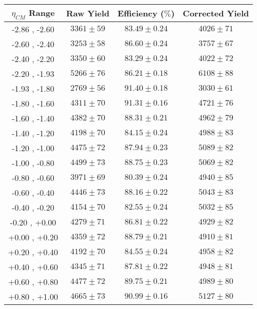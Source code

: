 \begin{table}[!h]
  \centering
  \renewcommand{\arraystretch}{1.5}
  \begin{tabular}{|c|*3c|}
    \hline
    $\eta_{CM}$ Range & Raw Yield & Efficiency ($\%$) & Corrected Yield\\
    \hline\hline
    -2.86 , -2.60 & $3361 \pm 59$ & $83.49 \pm 0.24$ & $4026 \pm 71$\\
    \hline
    -2.60 , -2.40 & $3253 \pm 58$ & $86.60 \pm 0.24$ & $3757 \pm 67$\\
    \hline
    -2.40 , -2.20 & $3350 \pm 60$ & $83.29 \pm 0.24$ & $4022 \pm 72$\\
    \hline
    -2.20 , -1.93 & $5266 \pm 76$ & $86.21 \pm 0.18$ & $6108 \pm 88$\\
    \hline
    -1.93 , -1.80 & $2769 \pm 56$ & $91.40 \pm 0.18$ & $3030 \pm 61$\\
    \hline
    -1.80 , -1.60 & $4311 \pm 70$ & $91.31 \pm 0.16$ & $4721 \pm 76$\\
    \hline
    -1.60 , -1.40 & $4382 \pm 70$ & $88.31 \pm 0.21$ & $4962 \pm 79$\\
    \hline
    -1.40 , -1.20 & $4198 \pm 70$ & $84.15 \pm 0.24$ & $4988 \pm 83$\\
    \hline
    -1.20 , -1.00 & $4475 \pm 72$ & $87.94 \pm 0.23$ & $5089 \pm 82$\\
    \hline
    -1.00 , -0.80 & $4499 \pm 73$ & $88.75 \pm 0.23$ & $5069 \pm 82$\\
    \hline
    -0.80 , -0.60 & $3971 \pm 69$ & $80.39 \pm 0.24$ & $4940 \pm 85$\\
    \hline
    -0.60 , -0.40 & $4446 \pm 73$ & $88.16 \pm 0.22$ & $5043 \pm 83$\\
    \hline
    -0.40 , -0.20 & $4154 \pm 70$ & $82.55 \pm 0.24$ & $5032 \pm 85$\\
    \hline
    -0.20 , +0.00 & $4279 \pm 71$ & $86.81 \pm 0.22$ & $4929 \pm 82$\\
    \hline
    +0.00 , +0.20 & $4359 \pm 72$ & $88.79 \pm 0.21$ & $4910 \pm 81$\\
    \hline
    +0.20 , +0.40 & $4192 \pm 70$ & $84.55 \pm 0.24$ & $4958 \pm 82$\\
    \hline
    +0.40 , +0.60 & $4345 \pm 71$ & $87.81 \pm 0.22$ & $4948 \pm 81$\\
    \hline
    +0.60 , +0.80 & $4477 \pm 72$ & $89.75 \pm 0.21$ & $4989 \pm 80$\\
    \hline
    +0.80 , +1.00 & $4665 \pm 73$ & $90.99 \pm 0.16$ & $5127 \pm 80$\\

\end{tabular}
\end{table}
